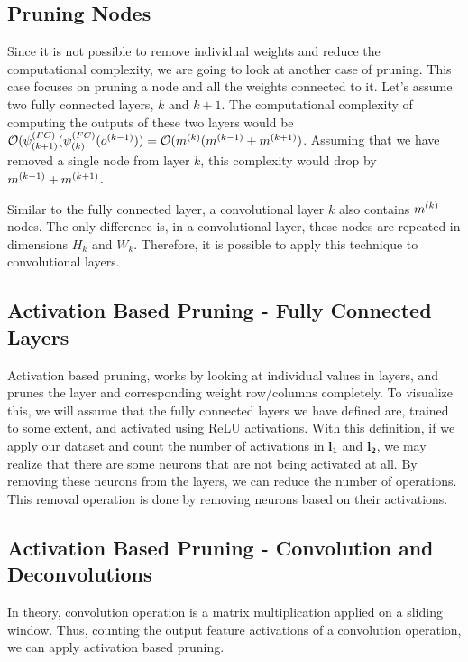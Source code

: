 \subsection{Pruning Nodes}
Since it is not possible to remove individual weights and reduce the computational complexity, we are going to look at another case of pruning. This case focuses on pruning a node and all the weights connected to it. Let's assume two fully connected layers, $k$ and $k+1$. The computational complexity of computing the outputs of these two layers would be $\mathcal{O}(\psi^{(FC)}_{(k+1)}(\psi^{(FC)}_{(k)}(o^{(k-1)})) = \mathcal{O}(m^{(k)}(m^{(k-1)} + m^{(k+1)})$. Assuming that we have removed a single node from layer $k$, this complexity would drop by $m^{(k-1)} + m^{(k+1)}$. 

Similar to the fully connected layer, a convolutional layer $k$ also contains $m^{(k)}$ nodes. The only difference is, in a convolutional layer, these nodes are repeated in dimensions $H_k$ and $W_k$. Therefore, it is possible to apply this technique to convolutional layers. 

\iffalse
\subsection{Activation Based Pruning - Fully Connected Layers} \label{sec:activation-based-pruning-convolution}
Activation based pruning, works by looking at individual values in layers, and prunes the layer and corresponding weight row/columns completely. To visualize this, we will assume that the fully connected layers we have defined are, trained to some extent, and activated using ReLU activations. With this definition, if we apply our dataset and count the number of activations in $\mathbf{l_1}$ and $\mathbf{l_2}$, we may realize that there are some neurons that are not being activated at all. By removing these neurons from the layers, we can reduce the number of operations. This removal operation is done by removing neurons based on their activations. 

\subsection{Activation Based Pruning - Convolution and Deconvolutions}
In theory, convolution operation is a matrix multiplication applied on a sliding window. Thus, counting the output feature activations of a convolution operation, we can apply activation based pruning. 

